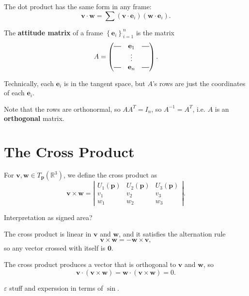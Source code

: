\documentclass[10pt]{report}
\begin{document}
The dot product has the same form in any frame:
\[
	\mathbf{v}\cdot \mathbf{w} = \sum (\mathbf{v}\cdot\mathbf{e}_i)(\mathbf{w}\cdot\mathbf{e}_i).
\] 

\begin{defn}[]
The \textbf{attitude matrix} of a frame $\left\{ \mathbf{e}_i \right\}_{i=1}^n$ is the matrix
\[
	A=
\begin{pmatrix}
	\rule[.5ex]{2.5ex}{0.5pt} & \mathbf{e}_1 & \rule[.5ex]{2.5ex}{0.5pt} \\
				  & \vdots & \\
	\rule[.5ex]{2.5ex}{0.5pt} & \mathbf{e}_n & \rule[.5ex]{2.5ex}{0.5pt}
\end{pmatrix}.
\] 
\end{defn}

Technically, each $\mathbf{e}_i$ is in the tangent space, but $A$'s rows are just the coordinates of each $\mathbf{e}_i$.

Note that the rows are orthonormal, so $A A^T = I_n$, so $A^{-1}=A^T$, i.e. $A$ is an \textbf{orthogonal} matrix.


\section{The Cross Product}

For $\mathbf{v}, \mathbf{w} \in T_{\mathbf{p}}(\mathbb{R}^3)$, we define the cross product as
\[
\mathbf{v} \times \mathbf{w} = \left| 
\begin{matrix}
	U_1(\mathbf{p}) & U_2(\mathbf{p}) & U_3(\mathbf{p}) \\
	v_1 & v_2 & v_3 \\
	w_1 & w_2 & w_3
\end{matrix}\right|.
\] 

{\color{red}Interpretation as signed area?}

The cross product is linear in $\mathbf{v}$ and $\mathbf{w}$, and it satisfies the alternation rule
\[
\mathbf{v} \times \mathbf{w} = -\mathbf{w}\times \mathbf{v},
\] so any vector crossed with itself is $\mathbf{0}$.

The cross product produces a vector that is orthogonal to $\mathbf{v}$ and $\mathbf{w}$, so
\[
	\mathbf{v} \cdot (\mathbf{v}\times \mathbf{w}) = \mathbf{w}\cdot (\mathbf{v}\times \mathbf{w}) = 0.
\] 

{\color{red}$\varepsilon$ stuff and experssion in terms of $\sin$.}
\end{document}
